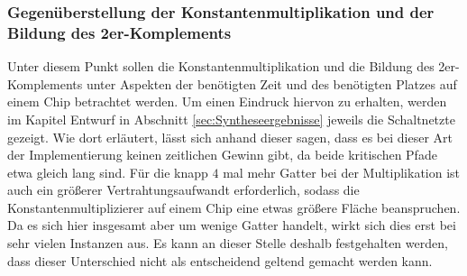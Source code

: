 \subsubsection{Gegenüberstellung der Konstantenmultiplikation und der Bildung des 2er-Komplements}

Unter diesem Punkt sollen die Konstantenmultiplikation und die Bildung des 2er-Komplements unter Aspekten der benötigten Zeit und des benötigten Platzes auf einem Chip 
betrachtet werden. Um einen Eindruck hiervon zu erhalten, werden im Kapitel Entwurf in Abschnitt \ref{sec:Syntheseergebnisse} jeweils die Schaltnetzte 
gezeigt.
Wie dort erläutert, lässt sich anhand dieser sagen, dass es bei dieser Art der Implementierung keinen zeitlichen Gewinn gibt, da beide kritischen Pfade etwa gleich lang 
sind. Für die knapp $4$ mal mehr Gatter bei der Multiplikation ist auch ein größerer Vertrahtungsaufwandt erforderlich, sodass die Konstantenmultiplizierer
auf einem Chip eine etwas größere Fläche beanspruchen. Da es sich hier insgesamt aber um wenige Gatter handelt, wirkt sich dies erst bei sehr vielen Instanzen aus.
Es kann an dieser Stelle deshalb festgehalten werden, dass dieser Unterschied nicht als entscheidend geltend gemacht werden kann.
